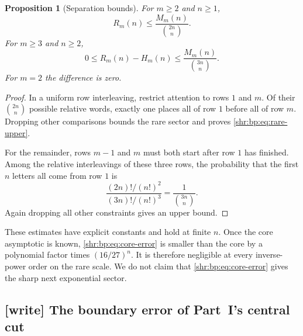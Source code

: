 \documentclass[11pt,letterpaper]{article}
\numberwithin{equation}{section}
\newtheorem{proposition}[theorem]{Proposition}
\theoremstyle{definition}
\newcommand{\1}{\mathbf 1}
\begin{document}
\begin{proposition}[Separation bounds]
\label{shr:bp:prop:separation}
For $m\ge2$ and $n\ge1$,
\begin{equation}
 R_m(n)\le\frac{M_m(n)}{\binom{2n}{n}}.
 \label{shr:bp:eq:rare-upper}
\end{equation}
For $m\ge3$ and $n\ge2$,
\begin{equation}
 0\le R_m(n)-H_m(n)\le\frac{M_m(n)}{\binom{3n}{n}}.
 \label{shr:bp:eq:core-error}
\end{equation}
For $m=2$ the difference is zero.
\end{proposition}
\begin{proof}
In a uniform row interleaving, restrict attention to rows $1$ and $m$.
Of their $\binom{2n}{n}$ possible relative words, exactly one places all
of row $1$ before all of row $m$. Dropping other comparisons bounds the
rare sector and proves \eqref{shr:bp:eq:rare-upper}.

For the remainder, rows $m-1$ and $m$ must both start after row $1$ has
finished. Among the relative interleavings of these three rows, the
probability that the first $n$ letters all come from row $1$ is
\[
 \frac{(2n)!/(n!)^2}{(3n)!/(n!)^3}=\frac1{\binom{3n}{n}}.
\]
Again dropping all other constraints gives an upper bound.
\end{proof}

These estimates have explicit constants and hold at finite $n$. Once
the core asymptotic is known, \eqref{shr:bp:eq:core-error} is smaller than the
core by a polynomial factor times $(16/27)^n$. It is therefore negligible
at every inverse-power order on the rare scale. We do not claim that
\eqref{shr:bp:eq:core-error} gives the sharp next exponential sector.

\subsection{[write] The boundary error of Part~I's central cut}
\label{shr:bp:sec:boundary}
\end{document}
